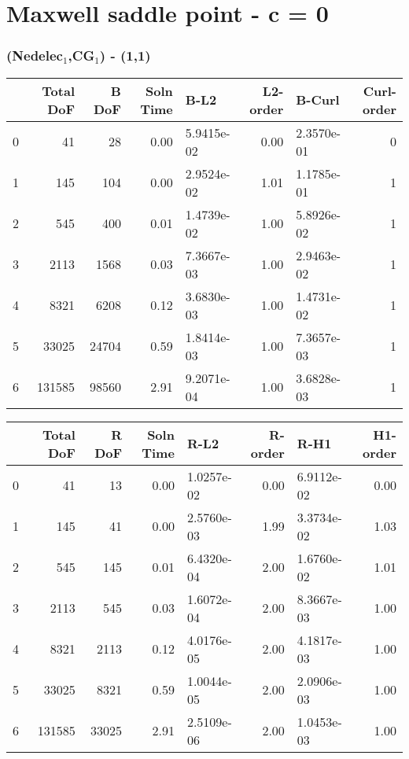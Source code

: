 \documentclass[12pt]{extarticle}
\numberwithin{equation}{section}    %
\begin{document}
\newpage

\section*{Maxwell saddle point - c = 0}

\subsubsection*{(Nedelec$_1$,CG$_1$) - (1,1)}

\begin{tabular}{lrrrlrlr}
\hline
{} &  Total DoF &  B DoF &  Soln Time &        B-L2 &  L2-order &      B-Curl &  Curl-order \\
\hline
0 &         41 &     28 &       0.00 &  5.9415e-02 &     0.00 &  2.3570e-01 &           0 \\
1 &        145 &    104 &       0.00 &  2.9524e-02 &     1.01 &  1.1785e-01 &           1 \\
2 &        545 &    400 &       0.01 &  1.4739e-02 &     1.00 &  5.8926e-02 &           1 \\
3 &       2113 &   1568 &       0.03 &  7.3667e-03 &     1.00 &  2.9463e-02 &           1 \\
4 &       8321 &   6208 &       0.12 &  3.6830e-03 &     1.00 &  1.4731e-02 &           1 \\
5 &      33025 &  24704 &       0.59 &  1.8414e-03 &     1.00 &  7.3657e-03 &           1 \\
6 &     131585 &  98560 &       2.91 &  9.2071e-04 &     1.00 &  3.6828e-03 &           1 \\
\hline
\end{tabular}

\begin{tabular}{lrrrlrlr}
\hline
{} &  Total DoF &  R DoF &  Soln Time &        R-L2 &  R-order &        R-H1 &  H1-order \\
\hline
0 &         41 &     13 &       0.00 &  1.0257e-02 &     0.00 &  6.9112e-02 &      0.00 \\
1 &        145 &     41 &       0.00 &  2.5760e-03 &     1.99 &  3.3734e-02 &      1.03 \\
2 &        545 &    145 &       0.01 &  6.4320e-04 &     2.00 &  1.6760e-02 &      1.01 \\
3 &       2113 &    545 &       0.03 &  1.6072e-04 &     2.00 &  8.3667e-03 &      1.00 \\
4 &       8321 &   2113 &       0.12 &  4.0176e-05 &     2.00 &  4.1817e-03 &      1.00 \\
5 &      33025 &   8321 &       0.59 &  1.0044e-05 &     2.00 &  2.0906e-03 &      1.00 \\
6 &     131585 &  33025 &       2.91 &  2.5109e-06 &     2.00 &  1.0453e-03 &      1.00 \\
\hline
\end{tabular}
\end{document}
